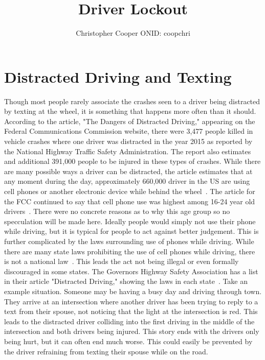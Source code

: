 \documentclass[12pt]{article}
\title{Driver Lockout}
\author{Christopher Cooper ONID: coopchri}
\begin{document}
\maketitle
\tableofcontents



\section{Distracted Driving and Texting}
Though most people rarely associate the crashes seen to a driver being distracted by texting at the wheel, it is something that happens more often than it should. According to the article, "The Dangers of Distracted Driving," appearing on the Federal Communications Commission website, there were 3,477 people killed in vehicle crashes where one driver was distracted in the year 2015 as reported by the National Highway Traffic Safety Administration. The report also estimates and additional 391,000 people to be injured in these types of crashes. While there are many possible ways a driver can be distracted, the article estimates that at any moment during the day, approximately 660,000 driver in the US are using cell phones or another electronic device while behind the wheel~\cite{fcc}.
The article for the FCC continued to say that cell phone use was highest among 16-24 year old drivers~\cite{fcc}. There were no concrete reasons as to why this age group so no specculation will be made here.
Ideally people would simply not use their phone while driving, but it is typical for people to act against better judgement. This is further complicated by the laws surrounding use of phones while driving. While there are many state laws prohibiting the use of cell phones while driving, there is not a national law~\cite{fcc}. This leads the act not being illegal or even formally discouraged in some states. The Governors Highway Safety Association has a list in their article "Distracted Driving," showing the laws in each state~\cite{statelaws}.
Take an example situation. Someone may be having a busy day and driving through town. They arrive at an intersection where another driver has been trying to reply to a text from their spouse, not noticing that the light at the intersection is red. This leads to the distracted driver colliding into the first driving in the middle of the intersection and both drivers being injured.
This story ends with the drivers only being hurt, but it can often end much worse. This could easily be prevented by the driver refraining from texting their spouse while on the road.
\end{document}
